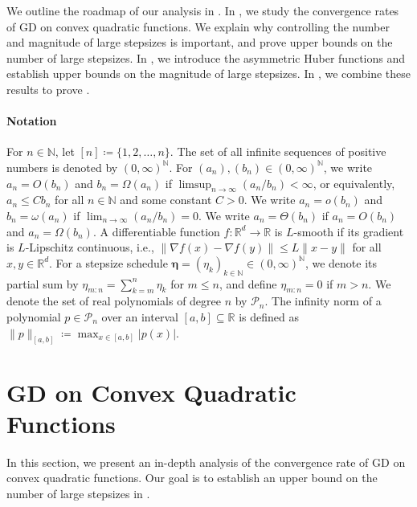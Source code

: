 \documentclass[11pt]{article}
\newcommand{\R}{\mathbb{R}}
\newcommand{\N}{\mathbb{N}}
\newcommand{\abs}[1]{\left\lvert#1\right\rvert}
\newcommand{\norm}[1]{\lVert#1\rVert}
\newcommand{\schedule}{\bm{\eta}}
\begin{document}
We outline the roadmap of our analysis in .
In , we study the convergence rates of GD on convex quadratic functions.
We explain why controlling the number and magnitude of large stepsizes is important, and prove upper bounds on the number of large stepsizes.
In , we introduce the asymmetric Huber functions and establish upper bounds on the magnitude of large stepsizes.
In , we combine these results to prove .


\paragraph{Notation}
For $n\in\N$, let $[n]\coloneqq\{1,2,\ldots,n\}$.
The set of all infinite sequences of positive numbers is denoted by $(0,\infty)^{\N}$.
For $(a_n), (b_n)\in(0,\infty)^{\N}$, we write $a_n=O(b_n)$ and $b_n=\Omega(a_n)$ if $\limsup_{n\to\infty}(a_n/b_n)<\infty$, or equivalently, $a_n\leq Cb_n$ for all $n\in\N$ and some constant $C>0$.
We write $a_n=o(b_n)$ and $b_n=\omega(a_n)$ if $\lim_{n\to\infty}(a_n/b_n)=0$.
We write $a_n=\Theta(b_n)$ if $a_n=O(b_n)$ and $a_n=\Omega(b_n)$.
A differentiable function $f:\R^d\to\R$ is $L$-smooth if its gradient is $L$-Lipschitz continuous, i.e., $\norm{ \nabla f(x) - \nabla f(y) } \leq L \norm{ x - y }$ for all $x,y\in\R^d$.
For a stepsize schedule $\schedule = (\eta_k)_{k\in\N} \in(0,\infty)^{\N}$, we denote its partial sum by $\eta_{m:n}=\sum_{k=m}^n \eta_k$ for $m\leq n$, and define $\eta_{m:n}=0$ if $m>n$.
We denote the set of real polynomials of degree $n$ by $\mathscr{P}_n$.
The infinity norm of a polynomial $p\in\mathscr{P}_n$ over an interval $[a,b]\subseteq\R$ is defined as $\norm{ p }_{[a,b]}\coloneqq \max_{x\in [a,b]} \abs{p(x)}$.



\section{GD on Convex Quadratic Functions}\label{sec:quadratic}

In this section, we present an in-depth analysis of the convergence rate of GD on convex quadratic functions.
Our goal is to establish an upper bound on the number of large stepsizes in .
\end{document}
